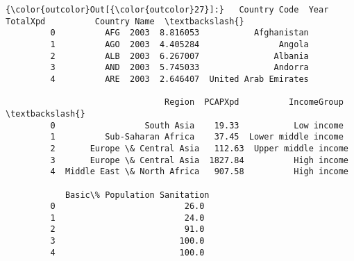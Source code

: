\documentclass[11pt]{article}
\begin{document}
\begin{Verbatim}[commandchars=\\\{\}]
{\color{outcolor}Out[{\color{outcolor}27}]:}   Country Code  Year  TotalXpd          Country Name  \textbackslash{}
         0          AFG  2003  8.816053           Afghanistan   
         1          AGO  2003  4.405284                Angola   
         2          ALB  2003  6.267007               Albania   
         3          AND  2003  5.745033               Andorra   
         4          ARE  2003  2.646407  United Arab Emirates   
         
                                Region  PCAPXpd          IncomeGroup  \textbackslash{}
         0                  South Asia    19.33           Low income   
         1          Sub-Saharan Africa    37.45  Lower middle income   
         2       Europe \& Central Asia   112.63  Upper middle income   
         3       Europe \& Central Asia  1827.84          High income   
         4  Middle East \& North Africa   907.58          High income   
         
            Basic\% Population Sanitation  
         0                          26.0  
         1                          24.0  
         2                          91.0  
         3                         100.0  
         4                         100.0  
\end{Verbatim}
            
\end{document}
